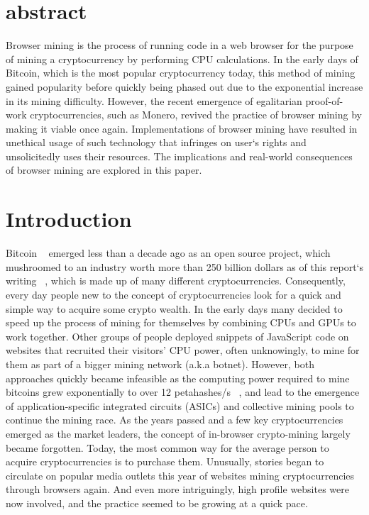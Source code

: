 \section{abstract}

Browser mining is the process of running code in a web browser for the purpose of mining a cryptocurrency by performing CPU calculations. In the early days of Bitcoin, which is the most popular cryptocurrency today, this method of mining gained popularity before quickly being phased out due to the exponential increase in its mining difficulty. However, the recent emergence of egalitarian proof-of-work cryptocurrencies, such as Monero, revived the practice of browser mining by making it viable once again. Implementations of browser mining have resulted in unethical usage of such technology that infringes on user`s rights and unsolicitedly uses their resources. The implications and real-world consequences of browser mining are explored in this paper.

\section{Introduction}

Bitcoin ~\cite{nakamoto2008bitcoin} emerged less than a decade ago as an open source project, which mushroomed to an industry worth more than 250 billion dollars as of this report`s writing ~\cite{coinmarketcap}, which is made up of many different cryptocurrencies. Consequently, every day people new to the concept of cryptocurrencies look for a quick and simple way to acquire some crypto wealth. In the early days many decided to speed up the process of mining for themselves by combining CPUs and GPUs to work together. Other groups of people deployed snippets of JavaScript code on websites that recruited their visitors’ CPU power, often unknowingly, to mine for them as part of a bigger mining network (a.k.a botnet). However, both approaches quickly became infeasible as the computing power required to mine bitcoins grew exponentially to over 12 petahashes/s ~\cite{blockchaininfohashrate}, and lead to the emergence of application-specific integrated circuits (ASICs) and collective mining pools to continue the mining race. As the years passed and a few key cryptocurrencies emerged as the market leaders, the concept of in-browser crypto-mining largely became forgotten. Today, the most common way for the average person to acquire cryptocurrencies is to purchase them. Unusually, stories began to circulate on popular media outlets this year of websites mining cryptocurrencies through browsers again. And even more intriguingly, high profile websites were now involved, and the practice seemed to be growing at a quick pace.

